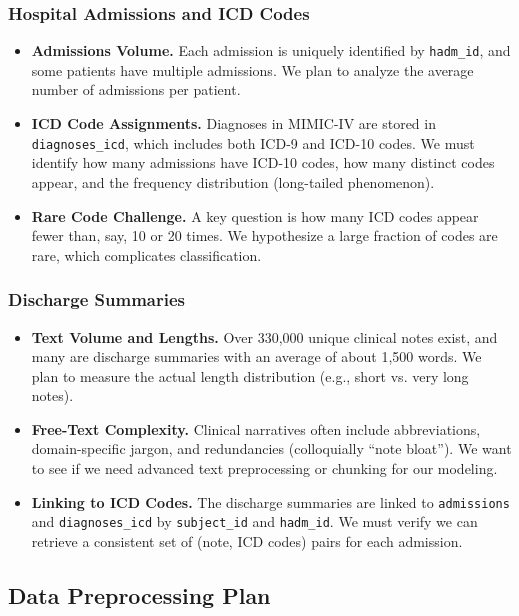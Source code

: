 \documentclass[12pt,a4paper]{report}
\begin{document}
\subsubsection{Hospital Admissions and ICD Codes}
\begin{itemize}
    \item \textbf{Admissions Volume.} Each admission is uniquely identified by \texttt{hadm\_id}, and some patients have multiple admissions. We plan to analyze the average number of admissions per patient.
    \item \textbf{ICD Code Assignments.} Diagnoses in MIMIC-IV are stored in \texttt{diagnoses\_icd}, which includes both ICD-9 and ICD-10 codes. We must identify how many admissions have ICD-10 codes, how many distinct codes appear, and the frequency distribution (long-tailed phenomenon).
    \item \textbf{Rare Code Challenge.} A key question is how many ICD codes appear fewer than, say, 10 or 20 times. We hypothesize a large fraction of codes are rare, which complicates classification.
\end{itemize}

\subsubsection{Discharge Summaries}
\begin{itemize}
    \item \textbf{Text Volume and Lengths.} Over 330,000 unique clinical notes exist, and many are discharge summaries with an average of about 1,500 words. We plan to measure the actual length distribution (e.g., short vs. very long notes).
    \item \textbf{Free-Text Complexity.} Clinical narratives often include abbreviations, domain-specific jargon, and redundancies (colloquially “note bloat”). We want to see if we need advanced text preprocessing or chunking for our modeling.
    \item \textbf{Linking to ICD Codes.} The discharge summaries are linked to \texttt{admissions} and \texttt{diagnoses\_icd} by \texttt{subject\_id} and \texttt{hadm\_id}. We must verify we can retrieve a consistent set of (note, ICD codes) pairs for each admission.
\end{itemize}

\subsection{Data Preprocessing Plan}
\end{document}
